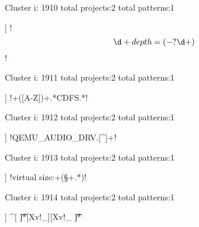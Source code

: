 Cluster i: 1910
total projects:2
total patterns:1
\begin{multicols}{1}
\begin{description}[noitemsep,topsep=0pt]
\item [[2] ] \cverb!\[\d+ depth=(-?\d+)\]!
\end{description}
\end{multicols}







Cluster i: 1911
total projects:2
total patterns:1
\begin{multicols}{1}
\begin{description}[noitemsep,topsep=0pt]
\item [[2] ] \cverb!\s+([A-Z])\s+.*CDFS.*\n!
\end{description}
\end{multicols}







Cluster i: 1912
total projects:2
total patterns:1
\begin{multicols}{1}
\begin{description}[noitemsep,topsep=0pt]
\item [[2] ] \cverb!QEMU_AUDIO_DRV.[^\s]+\s!
\end{description}
\end{multicols}







Cluster i: 1913
total projects:2
total patterns:1
\begin{multicols}{1}
\begin{description}[noitemsep,topsep=0pt]
\item [[2] ] \cverb!virtual size:\s+(\S+.*)!
\end{description}
\end{multicols}







Cluster i: 1914
total projects:2
total patterns:1
\begin{multicols}{1}
\begin{description}[noitemsep,topsep=0pt]
\item [[2] ] \cverb@^[ \t]*[Xv!_][Xv!_ \t]*\n@
\end{description}
\end{multicols}







